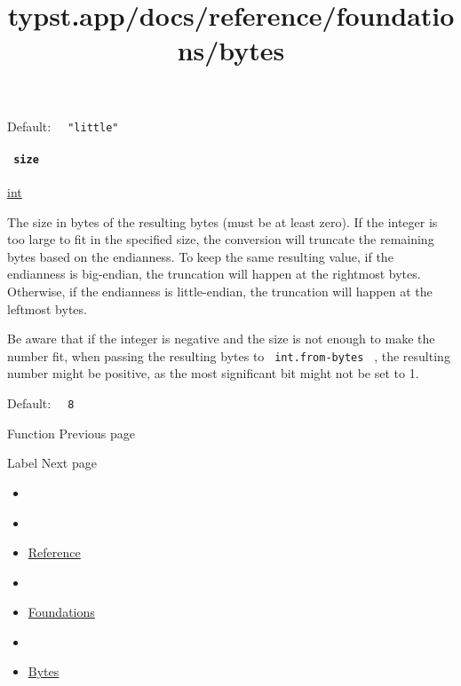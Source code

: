 Default: \texttt{\ }{\texttt{\ "little"\ }}\texttt{\ }

\paragraph{\texorpdfstring{\texttt{\ size\ }}{ size }}\label{definitions-to-bytes-size}

\href{/docs/reference/foundations/int/}{int}

The size in bytes of the resulting bytes (must be at least zero). If the
integer is too large to fit in the specified size, the conversion will
truncate the remaining bytes based on the endianness. To keep the same
resulting value, if the endianness is big-endian, the truncation will
happen at the rightmost bytes. Otherwise, if the endianness is
little-endian, the truncation will happen at the leftmost bytes.

Be aware that if the integer is negative and the size is not enough to
make the number fit, when passing the resulting bytes to
\texttt{\ int.from-bytes\ } , the resulting number might be positive, as
the most significant bit might not be set to 1.

Default: \texttt{\ }{\texttt{\ 8\ }}\texttt{\ }

\href{/docs/reference/foundations/function/}{\pandocbounded{}}

{ Function } { Previous page }

\href{/docs/reference/foundations/label/}{\pandocbounded{}}

{ Label } { Next page }


\title{typst.app/docs/reference/foundations/bytes}

\begin{itemize}
\tightlist
\item
  \href{/docs}{}
\item
  
\item
  \href{/docs/reference/}{Reference}
\item
  
\item
  \href{/docs/reference/foundations/}{Foundations}
\item
  
\item
  \href{/docs/reference/foundations/bytes/}{Bytes}
\end{itemize}

